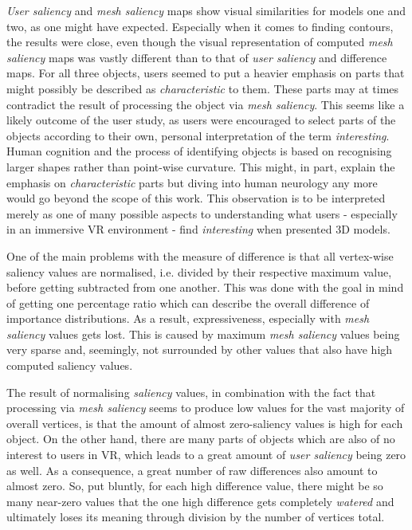 \textit{User saliency} and \textit{mesh saliency} maps show visual similarities for models one and two, as one might have expected. Especially when it comes to finding contours, the results were close, even though the visual representation of computed \textit{mesh saliency} maps was vastly different than to that of \textit{user saliency} and difference maps. For all three objects, users seemed to put a heavier emphasis on parts that might possibly be described as \textit{characteristic} to them. These parts may at times contradict the result of processing the object via \textit{mesh saliency}. This seems like a likely outcome of the user study, as users were encouraged to select parts of the objects according to their own, personal interpretation of the term \textit{interesting}. Human cognition and the process of identifying objects is based on recognising larger shapes rather than point-wise curvature. This might, in part, explain the emphasis on \textit{characteristic} parts but diving into human neurology any more would go beyond the scope of this work. This observation is to be interpreted merely as one of many possible aspects to understanding what users - especially in an immersive VR environment - find \textit{interesting} when presented 3D models.

One of the main problems with the measure of difference is that all vertex-wise saliency values are normalised, i.e. divided by their respective maximum value, before getting subtracted from one another. This was done with the goal in mind of getting one percentage ratio which can describe the overall difference of importance distributions. As a result, expressiveness, especially with \textit{mesh saliency} values gets lost. This is caused by maximum \textit{mesh saliency} values being very sparse and, seemingly, not surrounded by other values that also have high computed saliency values.

The result of normalising \textit{saliency} values, in combination with the fact that processing via \textit{mesh saliency} seems to produce low values for the vast majority of overall vertices, is that the amount of almost zero-saliency values is high for each object. On the other hand, there are many parts of objects which are also of no interest to users in VR, which leads to a great amount of \textit{user saliency} being zero as well. As a consequence, a great number of raw differences also amount to almost zero. So, put bluntly, for each high difference value, there might be so many near-zero values that the one high difference gets completely \textit{watered} and ultimately loses its meaning through division by the number of vertices total.

